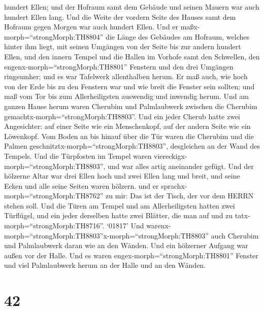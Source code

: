hundert Ellen; und der Hofraum samt dem Gebäude und seinen Mauern war
auch hundert Ellen lang.  Und die Weite der vordern Seite
des Hauses samt dem Hofraum gegen Morgen war auch hundert Ellen.
 Und er maßx-morph=``strongMorph:TH8804'' die Länge des
Gebäudes am Hofraum, welches hinter ihm liegt, mit seinen Umgängen von
der Seite bis zur andern hundert Ellen, und den innern Tempel und die
Hallen im Vorhofe  samt den Schwellen, den
engenx-morph=``strongMorph:TH8801'' Fenstern und den drei Umgängen
ringsumher; und es war Tafelwerk allenthalben herum.  Er
maß auch, wie hoch von der Erde bis zu den Fenstern war und wie breit
die Fenster sein sollten; und maß vom Tor bis zum Allerheiligsten
auswendig und inwendig herum.  Und am ganzen Hause herum
waren Cherubim und Palmlaubwerk zwischen die Cherubim
gemachtx-morph=``strongMorph:TH8803''.  Und ein jeder
Cherub hatte zwei Angesichter: auf einer Seite wie ein Menschenkopf, auf
der andern Seite wie ein Löwenkopf.  Vom Boden an bis
hinauf über die Tür waren die Cherubim und die Palmen
geschnitztx-morph=``strongMorph:TH8803'', desgleichen an der Wand des
Tempels.  Und die Türpfosten im Tempel waren
viereckigx-morph=``strongMorph:TH8803'', und war alles artig aneinander
gefügt.  Und der hölzerne Altar war drei Ellen hoch und
zwei Ellen lang und breit, und seine Ecken und alle seine Seiten waren
hölzern. und er sprachx-morph=``strongMorph:TH8762'' zu mir: Das ist der
Tisch, der vor dem HERRN stehen soll.  Und die Türen am
Tempel und am Allerheiligsten  hatten zwei Türflügel, und
ein jeder derselben hatte zwei Blätter, die man auf und zu
tatx-morph=``strongMorph:TH8716''.  `01817' Und
warenx-morph=``strongMorph:TH8803''x-morph=``strongMorph:TH8803'' auch
Cherubim und Palmlaubwerk daran wie an den Wänden. Und ein hölzerner
Aufgang war außen vor der Halle.  Und es waren
engex-morph=``strongMorph:TH8801'' Fenster und viel Palmlaubwerk herum
an der Halle und an den Wänden.

\hypertarget{section-41}{%
\section{42}\label{section-41}}

